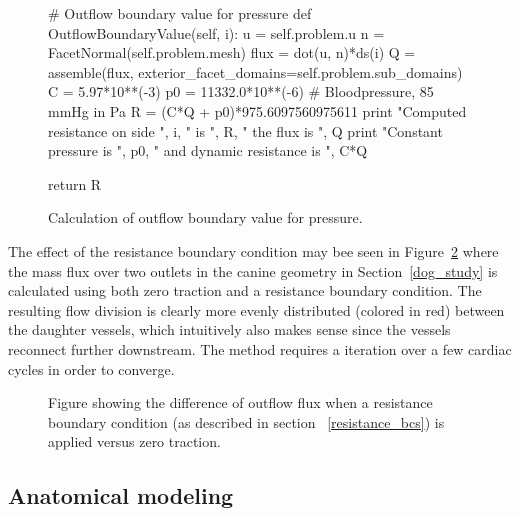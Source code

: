 \begin{figure}
  \codesize
  \begin{center}
    \begin{python}
# Outflow boundary value for pressure
def OutflowBoundaryValue(self, i):
    u = self.problem.u
    n = FacetNormal(self.problem.mesh)
    flux = dot(u, n)*ds(i)
    Q = assemble(flux, exterior_facet_domains=self.problem.sub_domains)
    C = 5.97*10**(-3)
    p0 = 11332.0*10**(-6) # Bloodpressure, 85 mmHg in Pa
    R = (C*Q + p0)*975.6097560975611
    print "Computed resistance on side ", i, " is ", R, " the flux is ", Q
    print "Constant pressure is ", p0, " and dynamic resistance is ", C*Q

    return R

    \end{python}
    \caption{Calculation of outflow boundary value for pressure.}
    \label{fig:resistance_code}
  \end{center}
\end{figure}

The effect of the resistance boundary condition may bee seen in
Figure~\ref{fig:resistance_bcs_fig} where the mass flux over two
outlets in the canine geometry in Section~\ref{dog_study} is
calculated using both zero traction and a resistance boundary
condition. The resulting flow division is clearly more evenly
distributed (colored in red) between the daughter vessels, which
intuitively also makes sense since the vessels reconnect further
downstream. The method requires a iteration over a few cardiac cycles
in order to converge.

\begin{figure}
  \begin{center}
  \end{center}
  \caption{Figure showing the difference of outflow flux when a resistance boundary condition
    (as described in section ~\ref{resistance_bcs}) is applied versus zero traction.}
  \label{fig:resistance_bcs_fig}
\end{figure}

\subsection{Anatomical modeling} \label{vmtk}

